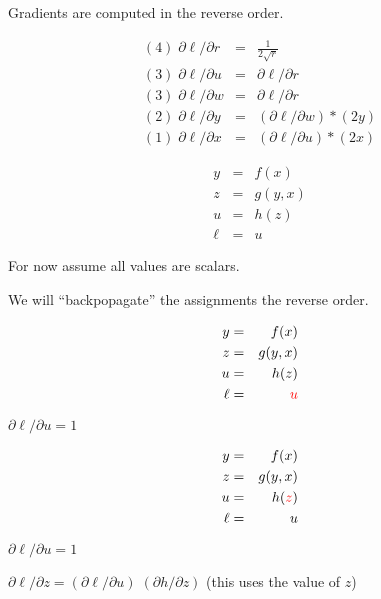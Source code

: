 {\vfill
Gradients are computed in the reverse order.

\vfill
$$\begin{array}{lcl}
(4)\; \partial\ell/\partial r & = & \frac{1}{2\sqrt{r}} \\
(3)\; \partial\ell/\partial u & = & \partial \ell/\partial r \\
(3)\; \partial\ell/\partial w & = & \partial \ell/\partial r\\
(2)\; \partial\ell/\partial y & = & (\partial \ell/\partial w) * (2y) \\
(1)\; \partial\ell/\partial x & = & (\partial \ell/\partial u) * (2x)
\end{array}$$

\vspace{-3ex}
\begin{eqnarray*}
  y & = & f(x) \\
  z & = & g(y,x) \\
  u & = & h(z) \\
  \ell & = & u
\end{eqnarray*}

\medskip
For now assume all values are scalars.

\medskip
We will ``backpopagate'' the assignments the reverse order.

\vspace{-3ex}
\begin{eqnarray*}
  y & = & f(x) \\
  z & = & g(y,x) \\
  u & = & h(z) \\
  \ell &  = & {\color{red} u}
\end{eqnarray*}

\medskip
{\color{red} ${\partial \ell}/{\partial u} = 1$}

\vspace{-3ex}
\begin{eqnarray*}
  y & = & f(x) \\
  z & = & g(y,x) \\
  u & = & h({\color{red} z}) \\
  \ell &  = &  u
\end{eqnarray*}

\medskip
${\partial \ell}/{\partial u} = 1$

\medskip
{\color{red} ${\partial \ell}/{\partial z} = ({\partial \ell}/{\partial u})\; ({\partial h}/{\partial z})$} (this uses the value of $z$)

}
